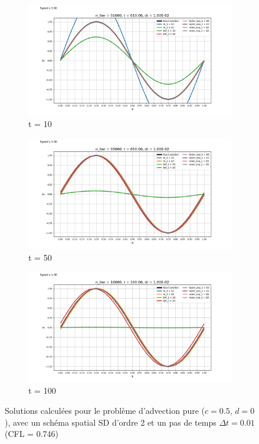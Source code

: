     \begin{figure}
        \centering
        \begin{subfigure}{.5\textwidth}
            \centering
            \includegraphics[width=\textwidth]{images/results/edp_advection_1.png}
            \caption{t = 10}
        \label{fig:edp_advection_1}
        \end{subfigure}
        \begin{subfigure}{.5\textwidth}
            \centering
            \includegraphics[width=\textwidth]{images/results/edp_advection_2.png}
            \caption{t = 50}
        \label{fig:edp_advection_2}
        \end{subfigure}%
        \begin{subfigure}{.5\textwidth}
            \centering
            \includegraphics[width=\textwidth]{images/results/edp_advection_3.png}
            \caption{t = 100}
        \label{fig:edp_advection_3}
        \end{subfigure}
    \caption{Solutions calculées pour le problème d'advection pure ($c = 0.5$, $d = 0$), avec un schéma spatial SD d'ordre 2 et un pas de temps $\Delta t = 0.01$ (CFL = 0.746)}
    \label{fig:edp_advection}
    \end{figure}
